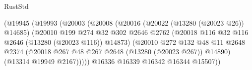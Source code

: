 \begin{lexlean}{RustStd}
\begin{coremodule}
                                              (@19945
                                                (@19993
                                                  (@20003
                                                    (@20008
                                                      (@20016
                                                        (@20022 (@13280 (@20023 @26)) @14685)
                                                        (@20010
                                                          @199
                                                          @274
                                                          @32
                                                          @302
                                                          @2646
                                                          @2762
                                                          (@20018
                                                            @116
                                                            @32
                                                            @116
                                                            @2646
                                                            (@13280 (@20023 @116))
                                                            @14873)
                                                          (@20010
                                                            @272
                                                            @132
                                                            @48
                                                            @11
                                                            @2648
                                                            @2374
                                                            (@20018
                                                              @267
                                                              @48
                                                              @267
                                                              @2648
                                                              (@13280 (@20023 @267))
                                                              @14890)
                                                            (@13314 @19949 @2167)))))
                                                    @16336
                                                    @16339
                                                    @16342
                                                    @16344
                                                    @15507))

\end{coremodule}
\end{lexlean}
